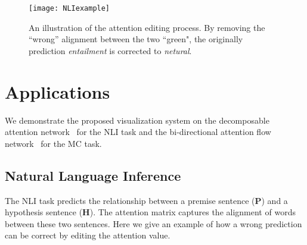 \begin{figure*}[t]
\centering
\vspace{-2mm}
 \texttt{[image: NLIexample]}
  \vspace{-6mm}
 \caption{
An illustration of the attention editing process. 
By removing the ``wrong'' alignment between the two ``green", the originally prediction \emph{entailment} is corrected to \emph{netural}.
}
  \vspace{-3mm}
\label{fig:NLIexample}
\end{figure*}

\section{Applications}
We demonstrate the proposed visualization system on the decomposable attention network~\cite{parikh2016emnlp}
for the NLI task and the bi-directional attention flow network~\cite{Seo2016} for the MC task.

\subsection{Natural Language Inference}
\label{sec:NLIexample}
The NLI task predicts the relationship between a premise sentence (\textbf{P}) and a hypothesis sentence (\textbf{H}).
The attention matrix captures the alignment of words between these two sentences.
Here we give an example of how a wrong prediction can be correct by editing the attention value.  


